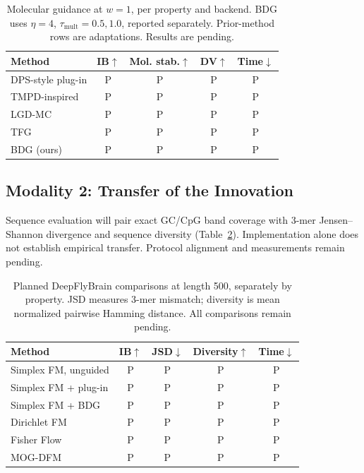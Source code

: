 \documentclass{article}
\newcommand{\pend}{\textcolor{black!60}{\textsf{P}}}
\begin{document}
\begin{table}[!htbp]
\centering\small
\caption{Molecular guidance at $w=1$, per property and backend. BDG uses $\eta=4$, $\tau_{\mathrm{mult}}=0.5,1.0$, reported separately. Prior-method rows are adaptations. Results are pending.}
\label{tab:recent}
\begin{tabular}{lcccc}
\toprule
Method & IB$\uparrow$ & Mol. stab.$\uparrow$ & DV$\uparrow$ & Time$\downarrow$\\
\midrule
DPS-style plug-in \citep{chung2023dps} & \pend & \pend & \pend & \pend\\
TMPD-inspired \citep{boys2024tmpd} & \pend & \pend & \pend & \pend\\
LGD-MC \citep{song2023lgd} & \pend & \pend & \pend & \pend\\
TFG \citep{ye2024tfg} & \pend & \pend & \pend & \pend\\
BDG (ours) & \pend & \pend & \pend & \pend\\
\bottomrule
\end{tabular}
\end{table}


\subsection{Modality 2: Transfer of the Innovation}\label{sec:m2}
Sequence evaluation will pair exact GC/CpG band coverage with 3-mer Jensen--Shannon divergence and sequence diversity (Table~\ref{tab:m2}). Implementation alone does not establish empirical transfer. Protocol alignment and measurements remain pending.

\begin{table}[!htbp]
\centering\small
\caption{Planned DeepFlyBrain comparisons at length 500, separately by property. JSD measures 3-mer mismatch; diversity is mean normalized pairwise Hamming distance. All comparisons remain pending.}
\label{tab:m2}
\begin{tabular}{lcccc}
\toprule
Method & IB$\uparrow$ & JSD$\downarrow$ & Diversity$\uparrow$ & Time$\downarrow$\\
\midrule
Simplex FM, unguided & \pend & \pend & \pend & \pend\\
Simplex FM + plug-in & \pend & \pend & \pend & \pend\\
Simplex FM + BDG & \pend & \pend & \pend & \pend\\
Dirichlet FM \citep{stark2024dirichlet} & \pend & \pend & \pend & \pend\\
Fisher Flow \citep{davis2024fisher} & \pend & \pend & \pend & \pend\\
MOG-DFM \citep{chen2025multi} & \pend & \pend & \pend & \pend\\
\bottomrule
\end{tabular}
\end{table}
\end{document}
